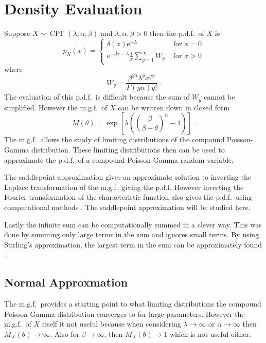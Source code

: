 \documentclass[12pt, a4paper]{memoir}
\DeclareMathOperator{\CPoisson}{CP\Gamma}
\newcommand{\euler}{\mathrm{e}}
\begin{document}
\section{Density Evaluation}
Suppose $X\sim\CPoisson(\lambda,\alpha,\beta)$ and $\lambda,\alpha,\beta>0$ then the p.d.f.~of $X$ is
\begin{equation}
p_X(x) = 
\begin{cases}
\delta(x) \euler^{-\lambda} & \text{ for } x=0 \\ 
\euler^{-\beta x-\lambda}\frac{1}{x}\sum_{y=1}^{\infty}W_y & \text{ for } x>0 
\end{cases}
\end{equation}
where
\begin{equation}
W_y = \frac{\beta^{y\alpha}\lambda^yx^{y\alpha}}{\Gamma(y\alpha)y!} \ .
\label{eq:compoundPoisson_w}
\end{equation}
The evaluation of this p.d.f.~is difficult because the sum of $W_y$ cannot be simplified. However the m.g.f.~of $X$ can be written down in closed form
\begin{equation}
M(\theta)=\exp\left[\lambda\left(\left(\frac{\beta}{\beta-\theta}\right)^{\alpha}-1\right)\right] \ .
\end{equation}
The m.g.f.~allows the study of limiting distributions of the compound Poisson-Gamma distribution. These limiting distributions then can be used to approximate the p.d.f.~of a compound Poisson-Gamma random variable.

The saddlepoint approximation \citep{daniels1954saddlepoint} gives an approximate solution to inverting the Laplace transformation  of the m.g.f.~giving the p.d.f. However inverting the Fourier transformation of the characteristic function also gives the p.d.f.~using computational methods \citep{dunn2008evaluation}. The saddlepoint approximation will be studied here.

Lastly the infinite sum can be computationally summed in a clever way. This was done by summing only large terms in the sum and ignores small terms. By using Stirling's approximation, the largest term in the sum can be approximately found \citep{dunn2005series}.

\subsection{Normal Approxmation}
The m.g.f.~provides a starting point to what limiting distributions the compound Poisson-Gamma distribution converges to for large parameters. However the m.g.f.~of $X$ itself it not useful because when considering $\lambda\rightarrow\infty$ or $\alpha\rightarrow\infty$ then $M_X(\theta)\rightarrow\infty$. Also for $\beta\rightarrow\infty$, then $M_X(\theta)\rightarrow 1$ which is not useful either.
\end{document}

